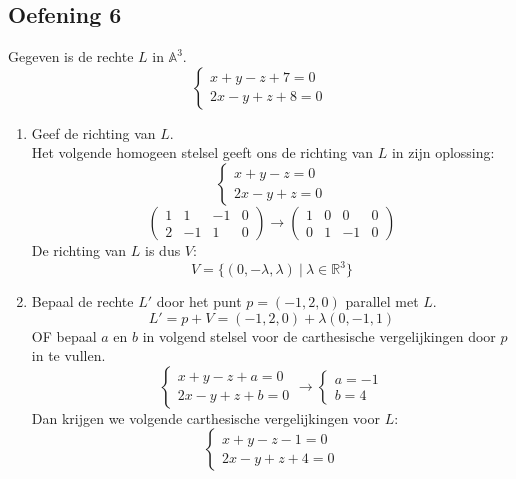 \documentclass[main.tex]{subfiles}
\begin{document}
\subsection*{Oefening 6}
Gegeven is de rechte $L$ in $\mathbb{A}^{3}$.
\[ 
\left\{
  \begin{array}{cc}
    x + y - z + 7 = 0\\
    2x - y + z + 8 = 0
  \end{array}
\right.
\]
\begin{enumerate}
\item Geef de richting van $L$.\\
  Het volgende homogeen stelsel geeft ons de richting van $L$ in zijn oplossing:
\[ 
\left\{
  \begin{array}{cc}
    x + y - z = 0\\
    2x - y + z = 0
  \end{array}
\right.
\]
\[
\begin{pmatrix}
  1 & 1 & -1 & 0\\
  2 & -1 & 1 & 0
\end{pmatrix}
\rightarrow
\begin{pmatrix}
  1 & 0 & 0  & 0\\
  0 & 1 & -1 & 0
\end{pmatrix}
\]
De richting van $L$ is dus $V$:
\[
V = \{ (0,-\lambda,\lambda)\ |\ \lambda \in \mathbb{R}^{3} \} 
\]
\item Bepaal de rechte $L'$ door het punt $p = (-1,2,0)$ parallel met $L$.\\
\[ L' = p + V = (-1,2,0) + \lambda (0,-1,1) \]
OF bepaal $a$ en $b$ in volgend stelsel voor de carthesische vergelijkingen door $p$ in te vullen.
\[ 
\left\{
  \begin{array}{cc}
    x + y - z + a = 0\\
    2x - y + z + b = 0
  \end{array}
\right.
\rightarrow 
\left\{
  \begin{array}{cc}
    a = -1\\
    b = 4
  \end{array}
\right.
\]
Dan krijgen we volgende carthesische vergelijkingen voor $L$:
\[ 
\left\{
  \begin{array}{cc}
    x + y - z  -1 = 0\\
    2x - y + z + 4 = 0
  \end{array}
\right.
\]
\end{enumerate}
\end{document}
